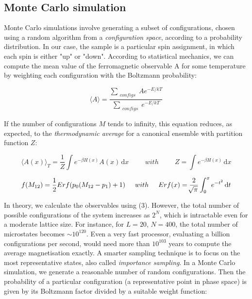 \documentclass[a4paper]{article}
\begin{document}
\subsection{Monte Carlo simulation}

Monte Carlo simulations involve generating a subset of configurations, chosen using a random algorithm from a \textit{configuration space}, according to a probability distribution\cite{mcs}. In our case, the sample is a particular spin assignment, in which each spin is either "up" or "down". According to statistical mechanics, we can compute the mean value of the ferromagnetic observable A for some temperature by weighting each configuration with the Boltzmann probability:

\begin{equation}
\langle A \rangle = \frac{\sum_{\substack{ configs}} A e^{-E/kT}}{\sum_{\substack{ configs}}  e^{-E/kT}}
\end{equation}

If the number of configurations $M$ tends to infinity, this equation reduces, as expected, to the \textit{thermodynamic average} for a canonical ensemble with partition function $Z$:

\begin{equation}
\langle A(x) \rangle_T = \frac{1}{Z} \int e^{-\beta H(x)}A(x)\, \mathrm{d}x \hspace{1cm}  with \hspace{1cm} Z = \int e^{-\beta H(x)}\, \mathrm{d}x
\end{equation}

\vspace{2cm}


\begin{equation}
f(M_{12})  = \frac{1}{2} Erf(p_0(M_{12} -p_{1}) + 1 ) \hspace{0.5cm} with \hspace{0.5cm} Erf(x) = \frac{2}{\sqrt[]{\pi}} \int_{0}^{x}  e^{-t^2}\, \mathrm{d}t
\end{equation}

In theory, we calculate the observables using (3). However, the total number of possible configurations of the system increases as $2^N$, which is intractable even for a moderate lattice size. For instance, for $L = 20 $, $N = 400$, the total number of microstates becomes $\sim 10^{120}$. Even a very fast processor, evaluating a billion configurations per second, would need more than $10^{103}$ years to compute the average magnetisation exactly. A smarter sampling technique is to focus on the most representative states, also called \textit{importance sampling}. In a Monte Carlo simulation, we generate a reasonable number of random configurations. Then the probability of a particular configuration (a representative point in phase space) is given by its Boltzmann factor divided by a suitable weight function:
\end{document}

